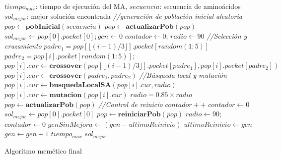 \begin{algorithm}[H]
    \begin{algorithmic}[1]
        \REQUIRE $tiempo_{max}$: tiempo de ejecución del MA, $secuencia$: secuencia de aminoácidos
        \ENSURE $sol_{mejor}$: mejor solución encontrada
        \STATE \textit{//generación de población inicial aleatoria}
        \STATE $pop \gets \textbf{pobInicial}(secuencia)$
        \STATE $pop \gets \textbf{actualizarPob}(pop)$
        \STATE $sol_{mejor} \gets pop[0].pocket[0]; gen \gets 0$
        \STATE $contador \gets 0$; $radio \gets 90$
        \REPEAT
            \STATE \textit{//Selección y cruzamiento}
            \STATE $padre_1 =
pop[\lfloor(i-1)/3\rfloor].pocket[random(1:5)]$ \label{line:par1}
            \STATE $padre_2 = pop[i].pocket[random(1:5)]$; \label{line:par2}
        \STATE $pop[i].cur \gets
\textbf{crossover}(pop[\lfloor(i-1)/3\rfloor].pocket[padre_1], pop[i].pocket[padre_2])$
            \STATE $pop[i].cur \gets \textbf{crossover}(padre_1,padre_2)$
\label{line:crossover}
            \ENDFOR
            \STATE \textit{//Búsqueda local y mutación}
                \STATE $pop[i].cur \gets
\textbf{busquedaLocalSA}(pop[i].cur,radio)$
                \STATE $pop[i].cur \gets \textbf{mutacion}(pop[i].cur)$
            \ENDFOR
            \STATE $radio = 0.85{\times}radio$
            \STATE $pop \gets \textbf{actualizarPob}(pop)$
\textit{//Control de reinicio}
                \STATE $contador++$
            \ELSE
                \STATE $contador \gets 0$
                \STATE $sol_{mejor} \gets pop[0].pocket[0]$
            \ENDIF
                \STATE $pop \gets \textbf{reiniciarPob}(pop)$
\label{line:restart}
                \STATE $radio \gets 90$; $contador \gets 0$
                \STATE $genSinMejora \gets (gen-ultimoReinicio)$
                \STATE $ultimoReinicio \gets gen$
            \ENDIF
            \STATE $gen \gets gen + 1$
        \UNTIL $tiempo_{max}$
        \RETURN $sol_{mejor}$
        \end{algorithmic}
        \caption{Algoritmo memético final}
		\label{alg:memetico-final}
\end{algorithm}

